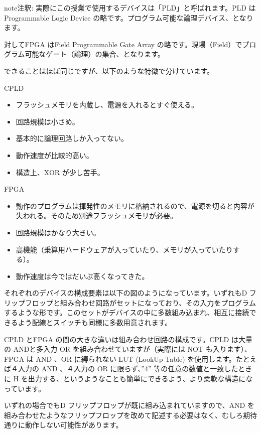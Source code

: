 \documentclass[letterpaper,10pt,dvipdfmx]{sphinxmanual}
\begin{document}
\begin{notice}{note}{注釈:}
実際にこの授業で使用するデバイスは「PLD」と呼ばれます。PLD は Programmable Logic Device の略です。プログラム可能な論理デバイス、となります。

対してFPGA はField Programmable Gate Array の略です。現場（Field）でプログラム可能なゲート（論理）の集合、となります。

できることはほぼ同じですが、以下のような特徴で分けています。

CPLD
\begin{itemize}
\item {} 
フラッシュメモリを内蔵し、電源を入れるとすぐ使える。

\item {} 
回路規模は小さめ。

\item {} 
基本的に論理回路しか入ってない。

\item {} 
動作速度が比較的高い。

\item {} 
構造上、XOR が少し苦手。

\end{itemize}

FPGA
\begin{itemize}
\item {} 
動作のプログラムは揮発性のメモリに格納されるので、電源を切ると内容が失われる。そのため別途フラッシュメモリが必要。

\item {} 
回路規模はかなり大きい。

\item {} 
高機能（乗算用ハードウェアが入っていたり、メモリが入っていたりする）。

\item {} 
動作速度は今ではだいぶ高くなってきた。

\end{itemize}

それぞれのデバイスの構成要素は以下の図のようになっています。いずれもD フリップフロップと組み合わせ回路がセットになっており、その入力をプログラムするような形です。このセットがデバイスの中に多数組み込まれ、相互に接続できるよう配線とスイッチも同様に多数用意されます。

CPLD とFPGA の間の大きな違いは組み合わせ回路の構成です。CPLD は大量の ANDと多入力 OR を組み合わせていますが（実際には NOT も入ります）、FPGA は AND 、OR に縛られない LUT (LookUp Table) を使用します。たとえば４入力の AND 、４入力の OR に限らず、''4'' 等の任意の数値と一致したときに H を出力する、というようなことも簡単にできるよう、より柔軟な構造になっています。

いずれの場合でもD フリップフロップが既に組み込まれていますので、AND を組み合わせたようなフリップフロップを改めて記述する必要はなく、むしろ期待通りに動作しない可能性があります。
\end{notice}
\end{document}
